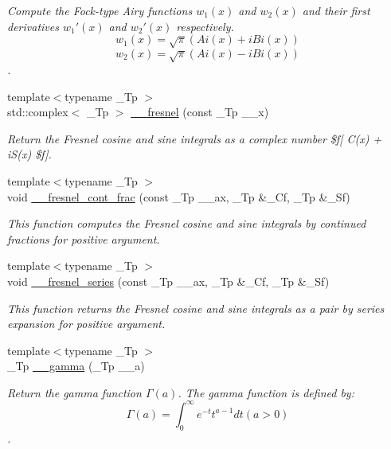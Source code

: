 \begin{DoxyCompactItemize}
\begin{DoxyCompactList}\small\item\em Compute the Fock-\/type Airy functions $ w_1(x) $ and $ w_2(x) $ and their first derivatives $ w_1'(x) $ and $ w_2'(x) $ respectively. \[ w_1(x) = \sqrt{\pi}(Ai(x) + iBi(x)) \] \[ w_2(x) = \sqrt{\pi}(Ai(x) - iBi(x)) \]. \end{DoxyCompactList}\item 
{\footnotesize template$<$typename \+\_\+\+Tp $>$ }\\std\+::complex$<$ \+\_\+\+Tp $>$ \hyperlink{namespacestd_1_1____detail_a322045015cfbde5a45e7718d533de60d}{\+\_\+\+\_\+fresnel} (const \+\_\+\+Tp \+\_\+\+\_\+x)
\begin{DoxyCompactList}\small\item\em Return the Fresnel cosine and sine integrals as a complex number \$f\mbox{[} C(x) + i\+S(x) \$f\mbox{]}. \end{DoxyCompactList}\item 
{\footnotesize template$<$typename \+\_\+\+Tp $>$ }\\void \hyperlink{namespacestd_1_1____detail_aeae8420e2fa1671f004066525adc99b6}{\+\_\+\+\_\+fresnel\+\_\+cont\+\_\+frac} (const \+\_\+\+Tp \+\_\+\+\_\+ax, \+\_\+\+Tp \&\+\_\+\+Cf, \+\_\+\+Tp \&\+\_\+\+Sf)
\begin{DoxyCompactList}\small\item\em This function computes the Fresnel cosine and sine integrals by continued fractions for positive argument. \end{DoxyCompactList}\item 
{\footnotesize template$<$typename \+\_\+\+Tp $>$ }\\void \hyperlink{namespacestd_1_1____detail_aae7775bc46d621e54fb9d994c2f35e2a}{\+\_\+\+\_\+fresnel\+\_\+series} (const \+\_\+\+Tp \+\_\+\+\_\+ax, \+\_\+\+Tp \&\+\_\+\+Cf, \+\_\+\+Tp \&\+\_\+\+Sf)
\begin{DoxyCompactList}\small\item\em This function returns the Fresnel cosine and sine integrals as a pair by series expansion for positive argument. \end{DoxyCompactList}\item 
{\footnotesize template$<$typename \+\_\+\+Tp $>$ }\\\+\_\+\+Tp \hyperlink{namespacestd_1_1____detail_a178e0b2cc0ae66b7d958e837da4fe4c1}{\+\_\+\+\_\+gamma} (\+\_\+\+Tp \+\_\+\+\_\+a)
\begin{DoxyCompactList}\small\item\em Return the gamma function $ \Gamma(a) $. The gamma function is defined by\+: \[ \Gamma(a) = \int_0^\infty e^{-t}t^{a-1}dt (a > 0) \]. \end{DoxyCompactList}\item 

\end{DoxyCompactItemize}
